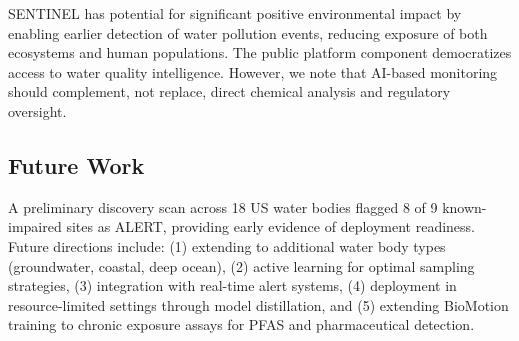 SENTINEL has potential for significant positive environmental impact by
enabling earlier detection of water pollution events, reducing exposure
of both ecosystems and human populations. The public platform component
democratizes access to water quality intelligence. However, we note that
AI-based monitoring should complement, not replace, direct chemical
analysis and regulatory oversight.

\subsection{Future Work}

A preliminary discovery scan across 18 US water bodies flagged 8 of 9
known-impaired sites as ALERT, providing early evidence of deployment
readiness. Future directions include: (1) extending to additional water
body types (groundwater, coastal, deep ocean), (2) active learning for
optimal sampling strategies, (3) integration with real-time alert systems,
(4) deployment in resource-limited settings through model distillation,
and (5) extending BioMotion training to chronic exposure assays for PFAS
and pharmaceutical detection.
